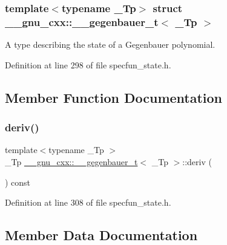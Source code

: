 \subsubsection*{template$<$typename \+\_\+\+Tp$>$\newline
struct \+\_\+\+\_\+gnu\+\_\+cxx\+::\+\_\+\+\_\+gegenbauer\+\_\+t$<$ \+\_\+\+Tp $>$}

A type describing the state of a Gegenbauer polynomial. 

Definition at line 298 of file specfun\+\_\+state.\+h.



\subsection{Member Function Documentation}
\mbox{\label{struct____gnu__cxx_1_1____gegenbauer__t_a7f67b4bddba90569373b9a7b67492f08}} 
\subsubsection{\texorpdfstring{deriv()}{deriv()}}
{\footnotesize\ttfamily template$<$typename \+\_\+\+Tp $>$ \\
\+\_\+\+Tp \hyperlink{struct____gnu__cxx_1_1____gegenbauer__t}{\+\_\+\+\_\+gnu\+\_\+cxx\+::\+\_\+\+\_\+gegenbauer\+\_\+t}$<$ \+\_\+\+Tp $>$\+::deriv (\begin{DoxyParamCaption}{ }\end{DoxyParamCaption}) const\hspace{0.3cm}{\ttfamily [inline]}}



Definition at line 308 of file specfun\+\_\+state.\+h.



\subsection{Member Data Documentation}
\mbox{\label{struct____gnu__cxx_1_1____gegenbauer__t_a84d400a2aa985534a294c1b4c4dedd40}} 

